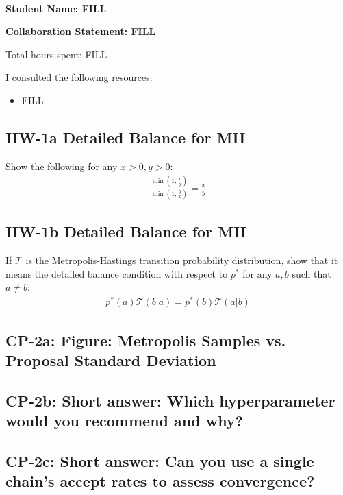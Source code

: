 \documentclass[10pt]{article}
\newcommand{\officialdirections}[1]{{\color{blue} #1}}
\begin{document}
~~\\ %

\Large{\bf Student Name: FILL}

\Large{\bf Collaboration Statement: FILL}

Total hours spent: FILL

I consulted the following resources:
\begin{itemize}
\item FILL
\end{itemize}

\tableofcontents

\newpage
\officialdirections{
\subsection{HW-1a Detailed Balance for MH}
Show the following for any $x > 0, y > 0$:
\begin{align}
\frac
  { \min \left( 1, \frac{x}{y} \right) }
  { \min \left( 1, \frac{y}{x} \right) }
=
\frac{x}{y}
\end{align}
}

\newpage
\officialdirections{
\subsection{HW-1b Detailed Balance for MH}
If $\mathcal{T}$ is the Metropolis-Hastings transition probability distribution, show that it means the detailed balance condition with respect to $p^*$ for any $a,b$ such that $a \neq b$:
\begin{align}
p^*( a) \mathcal{T}( b | a)  = p^*(b) \mathcal{T}( a | b)
\end{align}
}

\newpage

\subsection{CP-2a: Figure: Metropolis Samples vs. Proposal Standard Deviation}

\subsection{CP-2b: Short answer: Which hyperparameter would you recommend and why?}

\subsection{CP-2c: Short answer: Can you use a single chain's accept rates to assess convergence?}
\end{document}

